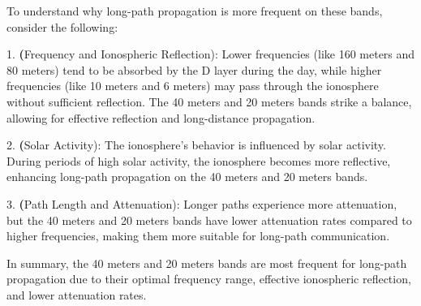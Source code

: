To understand why long-path propagation is more frequent on these bands, consider the following:

1. \textbf(Frequency and Ionospheric Reflection): Lower frequencies (like 160 meters and 80 meters) tend to be absorbed by the D layer during the day, while higher frequencies (like 10 meters and 6 meters) may pass through the ionosphere without sufficient reflection. The 40 meters and 20 meters bands strike a balance, allowing for effective reflection and long-distance propagation.

2. \textbf(Solar Activity): The ionosphere's behavior is influenced by solar activity. During periods of high solar activity, the ionosphere becomes more reflective, enhancing long-path propagation on the 40 meters and 20 meters bands.

3. \textbf(Path Length and Attenuation): Longer paths experience more attenuation, but the 40 meters and 20 meters bands have lower attenuation rates compared to higher frequencies, making them more suitable for long-path communication.

In summary, the 40 meters and 20 meters bands are most frequent for long-path propagation due to their optimal frequency range, effective ionospheric reflection, and lower attenuation rates.


